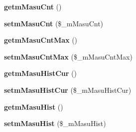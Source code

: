 \begin{DoxyCompactItemize}
\item 
{\bfseries getm\+Masu\+Cnt} ()\hypertarget{class_reversi_a32cebf699f9aa19d9053c143c3562d3a}{}\label{class_reversi_a32cebf699f9aa19d9053c143c3562d3a}

\item 
{\bfseries setm\+Masu\+Cnt} (\$\+\_\+m\+Masu\+Cnt)\hypertarget{class_reversi_ad50e5fa90e6a2f53bf71ed04bed603ae}{}\label{class_reversi_ad50e5fa90e6a2f53bf71ed04bed603ae}

\item 
{\bfseries getm\+Masu\+Cnt\+Max} ()\hypertarget{class_reversi_a3ac7b23d1b6567faa4d58d51a952c859}{}\label{class_reversi_a3ac7b23d1b6567faa4d58d51a952c859}

\item 
{\bfseries setm\+Masu\+Cnt\+Max} (\$\+\_\+m\+Masu\+Cnt\+Max)\hypertarget{class_reversi_ae2dbd35c16269ab04a58aba0194f7faf}{}\label{class_reversi_ae2dbd35c16269ab04a58aba0194f7faf}

\item 
{\bfseries getm\+Masu\+Hist\+Cur} ()\hypertarget{class_reversi_a577b674fea2b90470da3217b5390fe9c}{}\label{class_reversi_a577b674fea2b90470da3217b5390fe9c}

\item 
{\bfseries setm\+Masu\+Hist\+Cur} (\$\+\_\+m\+Masu\+Hist\+Cur)\hypertarget{class_reversi_a827554ef8aeb4c252bf4690c709ef762}{}\label{class_reversi_a827554ef8aeb4c252bf4690c709ef762}

\item 
{\bfseries getm\+Masu\+Hist} ()\hypertarget{class_reversi_a0eb2a30637500aef9245d2f82f68b769}{}\label{class_reversi_a0eb2a30637500aef9245d2f82f68b769}

\item 
{\bfseries setm\+Masu\+Hist} (\$\+\_\+m\+Masu\+Hist)\hypertarget{class_reversi_a26300550a0cc4f665b32426907b8ff0d}{}\label{class_reversi_a26300550a0cc4f665b32426907b8ff0d}


\end{DoxyCompactItemize}
